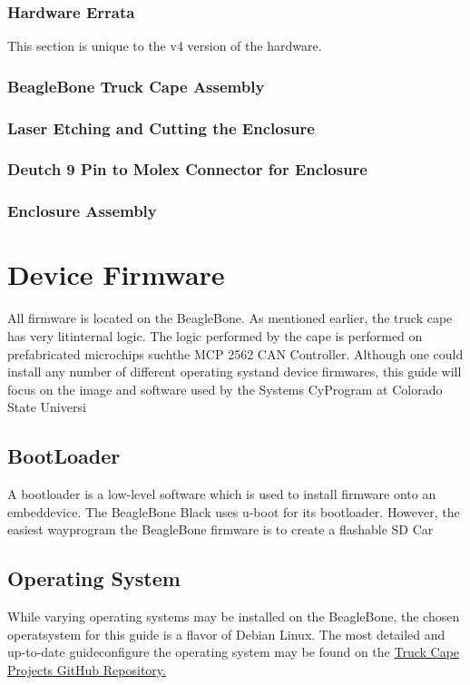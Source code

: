         \subsubsection{Hardware Errata}
            This section is unique to the v4 version of the hardware. 
        \subsubsection{BeagleBone Truck Cape Assembly}
        \subsubsection{Laser Etching and Cutting the Enclosure}
        \subsubsection{Deutch 9 Pin to Molex Connector for Enclosure}
        \subsubsection{Enclosure Assembly}

\section{Device Firmware}
    All firmware is located on the BeagleBone. As mentioned earlier, the truck cape has very litinternal logic. The logic performed by the cape is performed on prefabricated microchips suchthe MCP 2562 CAN Controller. Although one could install any number of different operating systand device firmwares, this guide will focus on the image and software used by the Systems CyProgram at Colorado State Universi
    \subsection{BootLoader}
        A bootloader is a low-level software which is used to install firmware onto an embeddevice. The BeagleBone Black uses u-boot for its bootloader. However, the easiest wayprogram the BeagleBone firmware is to create a flashable SD Car
    \subsection{Operating System}
        While varying operating systems may be installed on the BeagleBone, the chosen operatsystem for this guide is a flavor of Debian Linux. The most detailed and up-to-date guideconfigure the operating system may be found on the \href{https://github.com/SystemsCyTruckCapeProjects}{Truck Cape Projects GitHub Repository.}
